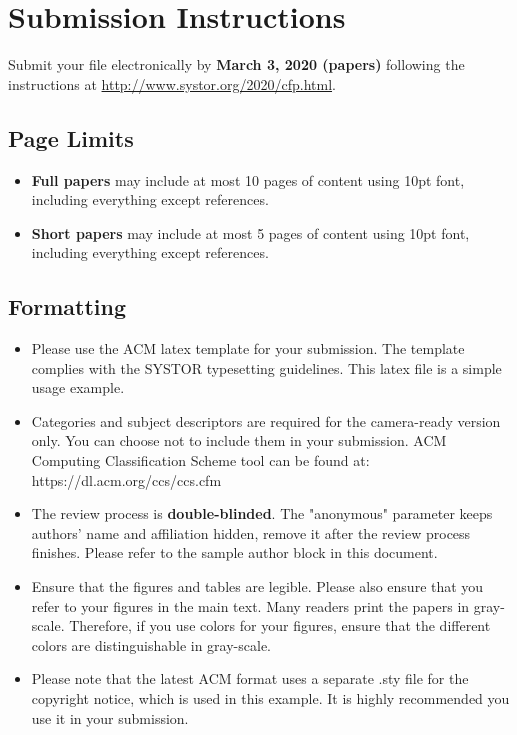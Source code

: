 \documentclass[sigconf,anonymous,10pt]{acmart}
\begin{document}
\maketitle

\sloppy

\section{Submission Instructions}

Submit your file electronically by \textbf{March 3, 2020 (papers)} following the instructions at \url{http://www.systor.org/2020/cfp.html}.

\subsection{Page Limits}
\begin{itemize}
	\item \textbf{Full papers} may include at most 10 pages of content using 10pt font, including everything except references.
	\item \textbf{Short papers} may include at most 5 pages of content using 10pt font, including everything except references.
\end{itemize}

\subsection{Formatting}
\begin{itemize}
	\item
	Please use the ACM latex template for your submission. The template complies with the SYSTOR typesetting guidelines. This latex file is a simple usage example.
	
	\item
	Categories and subject descriptors are required for the camera-ready version only. You can choose not to include them in your submission. ACM Computing Classification Scheme tool can be found at: https://dl.acm.org/ccs/ccs.cfm
	
	\item
	The review process is \textbf{double-blinded}. The "anonymous" parameter keeps authors' name and affiliation hidden, remove it after the review process finishes. Please refer to the sample author block in this document.
	
	\item
	Ensure that the figures and tables are legible.  Please also ensure that you refer to your figures in the main text. Many readers print the papers in gray-scale. Therefore, if you use colors for your figures, ensure that the different colors are distinguishable in gray-scale.
	
	\item
	Please note that the latest ACM format uses a separate .sty file for the copyright notice, which is used in this example. It is highly recommended you use it in your submission.
	
\end{itemize}
\end{document}
